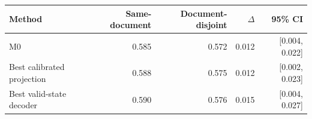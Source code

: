 \begin{tabular}{lrrrr}
\toprule
Method & Same-document & Document-disjoint & $\Delta$ & 95\% CI \\
\midrule
M0 & 0.585 & 0.572 & 0.012 & [0.004, 0.022] \\
Best calibrated projection & 0.588 & 0.575 & 0.012 & [0.002, 0.023] \\
Best valid-state decoder & 0.590 & 0.576 & 0.015 & [0.004, 0.027] \\
\bottomrule
\end{tabular}
